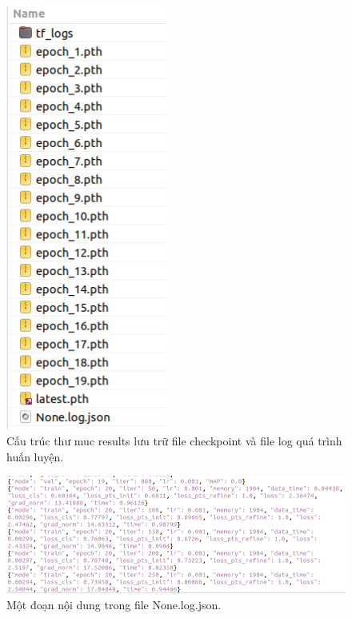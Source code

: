 \documentclass[12pt,a4paper,openany,oneside]{report}
\begin{document}
\begin{figure}[ht!]
	\begin{center}
		\includegraphics[width=200px]{./cau_truc_thu_muc_result.JPG}
		\caption{Cấu trúc thư muc results lưu trữ file checkpoint và file log quá trình huấn luyện.}
		\label{cau_truc_thu_muc_result}
	\end{center}
\end{figure} 

\begin{figure}[ht!]
	\begin{center}
		\includegraphics[width=450px]{./ket_qua_file_none_log_json.JPG}
		\caption{Một đoạn nội dung trong file None.log.json.}
		\label{ket_qua_file_none_log_json}
	\end{center}
\end{figure} 
\end{document}
